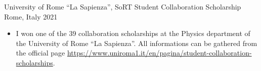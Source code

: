 



\begin{cventries}

  \cventry
  {University of Rome ``La Sapienza'', SoRT} %
    {Student Collaboration Scholarship} %
    {Rome, Italy}
    {2021} %
    {
      \begin{itemize} %
        \item I won one of the 39 collaboration scholarships at the Physics department of the University of Rome 
        ``La Sapienza''.
        All informations can be gathered from the official page \url{https://www.uniroma1.it/en/pagina/student-collaboration-scholarships}.
      \end{itemize}
    }
\end{cventries}